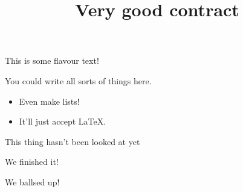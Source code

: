\documentclass{contract}
\title{Very good contract\vspace{-1cm}}
\date{}
\begin{document}
\maketitle


\begin{flavourtext}
  This is some flavour text!\par

  You could write all sorts of things here.

  \begin{itemize}[noitemsep]
    \item Even make lists!
    \item It'll just accept \LaTeX.
  \end{itemize}
\end{flavourtext}

\begin{tasks}
  \item This thing hasn't been looked at yet
  \item[\completed] We finished it!
  \item[\failed] We ballsed up!
  \item {}
\end{tasks}
\end{document}
